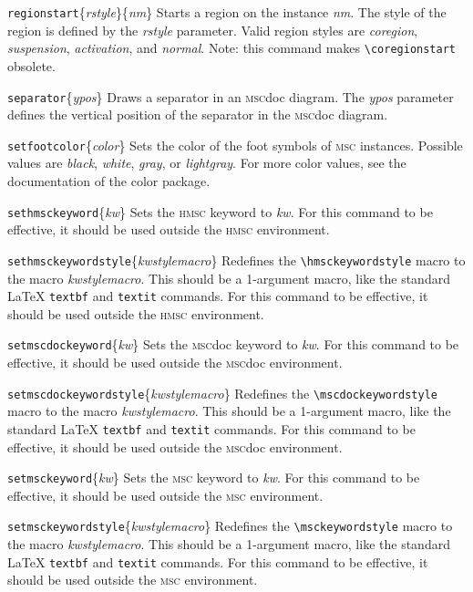 \documentclass[a4paper]{article}
\newcommand{\cmd}[1]{\texttt{\bslash #1}}
\newcommand{\acro}[1]{{\scshape\lowercase{#1}}}
\newcommand\MSC{\acro{MSC}}
\newcommand\HMSC{\acro{HMSC}}
\newcommand{\MSCdoc}{\MSC{}doc}
\newcommand{\cmdarg}[1]{\{\emph{#1}\}}
\newcommand{\coordarg}[1]{\emph{#1}}
\newenvironment{defs}{%
  \begin{list}{}%
              {\setlength{\labelwidth}{0pt}%
               \setlength{\labelsep}{1em}%
               \setlength{\leftmargin}{1em}%
               \setlength{\parsep}{1ex}%
               \setlength{\listparindent}{0pt}%
               \setlength{\rightmargin}{0pt}%
               \renewcommand{\makelabel}[1]{##1}%
               \raggedright%
              }%
  }{%
  \end{list}}
\begin{document}
\begin{defs}
\item[\cmd{regionstart}\{\emph{rstyle}\}\{\emph{nm}\}] Starts a region
on the instance \emph{nm}. The style of the region is defined by the
\emph{rstyle} parameter. Valid region styles are \emph{coregion},
\emph{suspension}, \emph{activation}, and \emph{normal}. Note: this
command makes \verb|\coregionstart| obsolete.

\item[\cmd{separator}\cmdarg{ypos}] Draws a separator in an \MSCdoc{}
diagram. The \coordarg{ypos} parameter defines the vertical position of the
separator in the \MSCdoc{} diagram.

\item[\cmd{setfootcolor}\{\emph{color}\}] Sets the color of the foot symbols of
\MSC{} instances. Possible values are \emph{black}, \emph{white},
\emph{gray}, or \emph{lightgray}. For more color values, see the
documentation of the \LaTeXe{} \textsf{color} package.

\item[\cmd{sethmsckeyword}\{\emph{kw}\}] Sets the \HMSC{} keyword to
\emph{kw}. For this command to be effective, it should be used outside
the \HMSC{} environment.

\item[\cmd{sethmsckeywordstyle}\{\emph{kwstylemacro}\}] Redefines the
\verb|\hmsckeywordstyle| macro to the macro \emph{kwstylemacro}. This
should be a 1-argument macro, like the standard \LaTeX{}
\cmd{textbf} and \cmd{textit}  commands. For this command to be effective, it
should be used outside the \HMSC{} environment.

\item[\cmd{setmscdockeyword}\{\emph{kw}\}] Sets the \MSCdoc{} keyword to
\emph{kw}. For this command to be effective, it should be used outside
the \MSCdoc{} environment.

\item[\cmd{setmscdockeywordstyle}\{\emph{kwstylemacro}\}] Redefines the
\verb|\mscdockeywordstyle| macro to the macro \emph{kwstylemacro}. This
should be a 1-argument macro, like the standard \LaTeX{}
\cmd{textbf} and \cmd{textit}  commands. For this command to be effective, it
should be used outside the \MSCdoc{} environment.


\item[\cmd{setmsckeyword}\{\emph{kw}\}] Sets the \MSC{} keyword to
\emph{kw}. For this command to be effective, it should be used outside
the \MSC{} environment.

\item[\cmd{setmsckeywordstyle}\{\emph{kwstylemacro}\}] Redefines the
\verb|\msckeywordstyle| macro to the macro \emph{kwstylemacro}. This
should be a 1-argument macro, like the standard \LaTeX{}
\cmd{textbf} and \cmd{textit}  commands. For this command to be effective, it
should be used outside the \MSC{} environment.


\end{defs}
\end{document}
